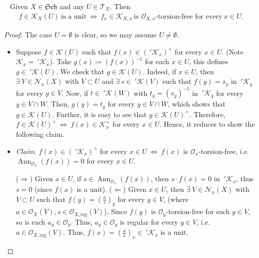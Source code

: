 \documentclass[11pt,a4paper,footinclude=true,headinclude=true]{scrbook} %
\DeclareMathOperator{\Ann}{Ann}
\newcommand{\KK}{\mathscr{K}}
\newcommand{\NN}{\mathcal{N}}
\newcommand{\OO}{\mathcal{O}}
\newcommand{\TT}{\mathcal{T}}
\newcommand{\reg}{\mathrm{reg}}
\newcommand{\Sch}{\mathfrak{Sch}}
\newcommand{\<}{\langle}
\newcommand{\>}{\rangle}
\newenvironment{lemma}[2][]
{\renewcommand\theinnercustomlemma{#2}\innercustomlemma[#1]
\begin{mdframed}[backgroundcolor=gray!20]\ }
{\end{mdframed}\endinnercustomprop}
\begin{document}
\begin{lemma}{6.D}
    Given $X\in\Sch$ and any $U\in\TT_X$. Then 
    \begin{align*}
        f\in\KK_X(U)\ \text{is a unit}\ \Longleftrightarrow\ f_x\in\KK_{X,x}\ \text{is $\OO_{X,x}$-torsion-free for every}\ x\in U.
    \end{align*}
\end{lemma}
\begin{proof}
    The case $U=\emptyset$ is clear, so we may assume $U\neq\emptyset$.
    \begin{itemize}
        \item Suppose $f\in\KK(U)$ such that $f(x)\in(\:'\KK_x)^\times$ for every $x\in U$. (Note $\KK_x=\:'\KK_x$). Take $g(x)\coloneqq(f(x))^{-1}$ for each $x\in U$, this defines $g\in\:'\KK(U)$. We check that $g\in\KK(U)$. Indeed, if $x\in U$, then $\exists\ V\in\NN_x(X)$ with $V\subset U$ and $\exists\ s\in\:'\KK(V)$ such that $f(y)=s_y$ in $\:'\KK_y$ for every $y\in V$. Now, if $t\in\:'\KK(W)$ with $t_y=(s_y)^{-1}$ in $\:'\KK_y$ for every $y\in V\cap W$. Then, $g(y)=t_y$ for every $y\in V\cap W$, which shows that $g\in\KK(U)$. Further, it is easy to see that $g\in\KK(U)^\times$. Therefore, $f\in\KK(U)^\times\ \Longleftrightarrow\ f(x)\in\KK_x^\times$ for every $x\in U$. Hence, it reduces to show the following claim.
        \item \textit{Claim}. $f(x)\in(\:'\KK_x)^\times$ for every $x\in U\ \Longleftrightarrow\ f(x)$ is $\OO_x$-torsion-free, i.e. $\Ann_{\OO_x}(f(x))=0$ for every $x\in U$.
        
        ($\Rightarrow$) Given $x\in U$, if $s\in\Ann_{\OO_x}(f(x))$, then $s\cdot f(x)=0$ in $\:'\KK_x$, thus $s=0$ (since $f(x)$ is a unit).
        ($\Leftarrow$) Given $x\in U$, then $\exists\ V\in\NN_x(X)$ with $V\subset U$ such that $f(y)=(\frac{a}{s})_y$ for every $y\in V$, (where $a\in\OO_X(V),s\in\OO_{X,\reg}(V)$). Since $f(y)$ is $\OO_y$-torsion-free for each $y\in V$, so is each $a_y\in\OO_y$. Thus, $a_y\in\OO_y$ is regular for every $y\in V$, i.e. $a\in\OO_{X,\reg}(V)$. Thus, $f(x)=(\frac{a}{s})_x\in\:'\KK_x$ is a unit.
    \end{itemize}
\end{proof}
\end{document}
